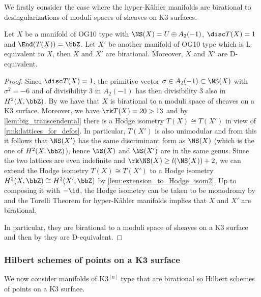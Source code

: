 \documentclass{amsart}
\begin{document}
We firstly consider the case where the hyper-Kähler manifolds are birational to desingularizations of moduli spaces of sheaves on K3 surfaces.

\begin{proposition}\label{prop:OG10_moduli_spaces}
Let \(X\) be a manifold of OG10 type with \(\NS(X)=U\oplus A_2(-1)\), \(\disc T(X)=1\) and \(\End(T(X))=\bbZ\). Let \(X'\) be another manifold of OG10 type which is L-equivalent to \(X\), then \(X\) and \(X'\) are birational. Moreover, \(X\) and \(X'\) are D-equivalent.
\end{proposition}

\begin{proof}
Since \(\disc T(X)=1\), the primitive vector \(\sigma\in A_2(-1) \subset \NS(X)\) with \(\sigma^2=-6\) and of divisibility \(3\) in \(A_2(-1)\) has then divisibility \(3\) also in \(H^2(X,\bbZ)\).
    By \cite[Theorem 3.13]{FGG:OG10_as_moduli} we have that \(X\) is birational to a moduli space of sheaves on a K3 surface. Moreover, we have \(\rk T(X)=20>13\) and by \autoref{lem:big_transcendental} there is a Hodge isometry \(T(X)\cong T(X')\) in view of \autoref{rmk:lattices_for_defos}.
    In particular, \(T(X')\) is also unimodular and from this it follows that \(\NS(X')\) has the same discriminant form as \(\NS(X)\) (which is the one of \(H^2(X,\bbZ)\)), hence \(\NS(X)\) and \(\NS(X')\) are in the same genus. 
    Since the two lattices are even indefinite and \(\rk \NS(X)\geq l(\NS(X))+2\), we can extend the Hodge isometry \(T(X)\cong T(X')\) to a Hodge isometry \(H^2(X,\bbZ)\cong H^2(X',\bbZ)\) by \autoref{lem:extension_to_Hodge_isom2}. Up to composing it with \(-\id\), the Hodge isometry can be taken to be monodromy by \cite[Theorem 5.4]{onorati_monodromy} and the Torelli Theorem for hyper-Kähler manifolds \cite[Theorem 1.3]{markman2011survey} implies that \(X\) and \(X'\) are birational. 
    
    In particular, they are birational to a moduli space of sheaves on a K3 surface and then by \cite[Theorem 4.5.1]{halpern2020derived} they are D-equivalent.

\end{proof}





\subsubsection{Hilbert schemes of points on a K3 surface}

We now consider manifolds of K3\(^{[n]}\) type that are birational so Hilbert schemes of points on a K3 surface. 
\end{document}

